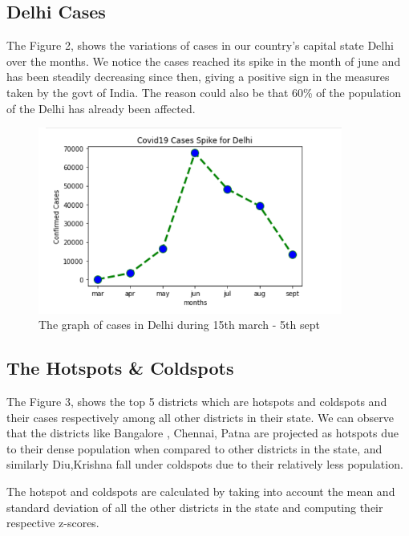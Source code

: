 \documentclass{article}
\begin{document}
\subsection{Delhi Cases}
\vspace{0.5cm}
\hspace{2cm}The Figure 2, shows the variations of cases in our country's capital state Delhi over the months. We notice the cases reached its spike in the month of june and has been steadily decreasing since then, giving a positive sign in the measures taken by the govt of India. The reason could also be that 60\% of the population of the Delhi has already been affected.




\begin{figure}[htp]
    \centering
    \includegraphics[width=10cm]{delhicases.png}
    \caption{The graph of cases in Delhi during 15th march - 5th sept}
    \label{fig:delhigraph}
\end{figure}
\FloatBarrier
\subsection{The Hotspots \& Coldspots}
\vspace{0.5cm}
\hspace{2cm} The Figure 3, shows the top 5 districts which are hotspots and coldspots and their cases respectively among all other districts in their state. We can observe that the districts like Bangalore , Chennai, Patna are projected as hotspots due to their dense population when compared to other districts in the state, and similarly Diu,Krishna fall under coldspots due to their relatively less population.\newline

\hspace{2cm} The hotspot and coldspots are calculated by taking into account the mean and standard deviation of all the other districts in the state and computing their respective z-scores.
\end{document}

